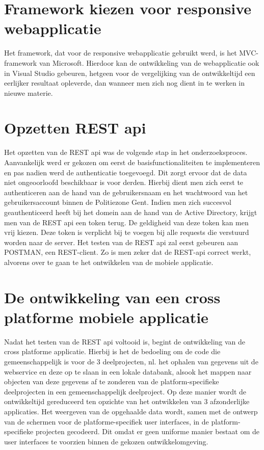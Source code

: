 \section{Framework kiezen voor responsive webapplicatie}
Het framework, dat voor de responsive webapplicatie gebruikt werd, is het MVC-framework van Microsoft.
Hierdoor kan de ontwikkeling van de webapplicatie ook in Visual Studio gebeuren, hetgeen voor de vergelijking van de ontwikkeltijd
een eerlijker resultaat opleverde, dan wanneer men zich nog dient in te werken in nieuwe materie.

\section{Opzetten REST api}
Het opzetten van de REST api was de volgende stap in het onderzoeksproces. Aanvankelijk werd er gekozen om eerst de basisfunctionaliteiten te implementeren en
pas nadien werd de authenticatie toegevoegd. Dit zorgt ervoor dat de data niet ongeoorloofd beschikbaar is voor derden.
Hierbij dient men zich eerst te authenticeren aan de hand van de gebruikersnaam en het wachtwoord van het gebruikersaccount binnen de Politiezone Gent.
Indien men zich succesvol geauthenticeerd heeft bij het domein aan de hand van de Active Directory, krijgt men van de REST api een token terug. De geldigheid van deze token kan men vrij kiezen.
Deze token is verplicht bij te voegen bij alle requests die verstuurd worden naar de server.
Het testen van de REST api zal eerst gebeuren aan POSTMAN, een REST-client. Zo is men zeker dat de REST-api correct werkt, alvorens over te gaan te het ontwikkelen van de mobiele applicatie.

\section{De ontwikkeling van een cross platforme mobiele applicatie}
Nadat het testen van de REST api voltooid is, begint de ontwikkeling van de cross platforme applicatie.
Hierbij is het de bedoeling om de code die gemeenschappelijk is voor de 3 deelprojecten,
nl. het ophalen van gegevens uit de webservice en deze op te slaan in een lokale databank, alsook het mappen naar objecten van deze gegevens
 af te zonderen van de platform-specifieke deelprojecten in een gemeenschappelijk deelproject.
 Op deze manier wordt de ontwikkeltijd gereduceerd ten opzichte van het ontwikkelen van 3 afzonderlijke applicaties.
Het weergeven van de opgehaalde data wordt, samen met de ontwerp van de schermen voor de platforme-specifiek user interfaces,
in de platform-specifieke projecten gecodeerd. Dit omdat er geen uniforme manier bestaat om de user interfaces te voorzien binnen
de gekozen ontwikkelomgeving.


